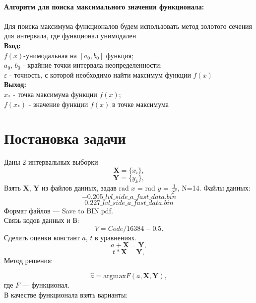 \documentclass[10pt]{article}
\begin{document}
\vspace{0.5cm}
\\\textbf{Алгоритм для поиска максимального значения функционала:}\\\\
Для поиска максимума функционалов будем использовать метод золотого сечения для интервала, где функционал унимодален\\
\textbf{Вход:} 
\\$f(x)$-унимодальная на $[a_0,b_0]$ функция; 
\\$a_0$, $b_0$ - крайние точки интервала неопределенности;
\\$\varepsilon$ - точность, с которой необходимо найти максимум функции $f(x)$
\\
\textbf{Выход:} 
\\$x_*$ - точка максимума функции $f(x)$;
\\$f(x_*)$ - значение функции $f(x)$ в точке максимума

\section{Постановка задачи}
Даны 2 интервальных выборки
\begin{equation}
    \mathbf{X}=\{x_i\},
\end{equation}
\begin{equation}
    \mathbf{Y}=\{y_k\},
\end{equation}
Взять $\mathbf{X}$, $\mathbf{Y}$ из файлов данных, задав rad $x$ = rad $y$ = $\frac{1}{2^N}$, N=14.
Файлы данных:
\[−0.205\_lvl\_side\_a\_fast\_data.bin\]
\[0.227\_lvl\_side\_a\_fast\_data.bin\]
Формат файлов — Save to BIN.pdf.\\
Связь кодов данных и В:\\
\[V = Code/16384 − 0.5.\]
Сделать оценки констант $a$, $t$ в уравнениях.
\begin{equation}
    a+\mathbf{X}=\mathbf{Y},
\end{equation}
\begin{equation}
    t*\mathbf{X}=\mathbf{Y},
\end{equation}
Метод решения:

\begin{equation}
    \hat a = \text{argmax} F(a, \mathbf{X}, \mathbf{Y}),
\end{equation}
где \( F \) --- функционал.
\\
В качестве функционала взять варианты:
\end{document}
